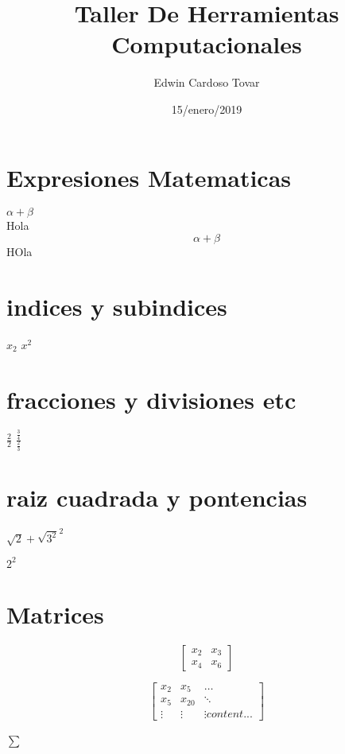 \documentclass{article}
\title{\Huge Taller De Herramientas Computacionales}
\author{Edwin Cardoso Tovar}
\date{15/enero/2019}
\begin{document}
\maketitle
\begin{center}
	
\end{center}
\newpage
\section*{Expresiones Matematicas}
$\alpha + \beta$\\ %
Hola\[\alpha + \beta\]HOla %

\section*{indices y subindices}%
$x_{2}$
$x^{2}$\\

\section*{fracciones y divisiones etc}
$\frac{2}{2}$
$\frac{\frac{3}{4}}{\frac{2}{3}}$

\section{raiz cuadrada y pontencias}
$\sqrt{2} + \sqrt{3^2}^2$



$2^2$






\section*{Matrices}
\[\begin{bmatrix}
x_{2} & x_{3}\\
x_{4} & x_{6}
\end{bmatrix}\]

\[
\begin{bmatrix}
x_{2} & x_{5} & \dots\\
x_{5} & x_{20} & \ddots\\
\vdots & \vdots & \vdots
content...
\end{bmatrix}
\]\\

$\sum$
\end{document}
